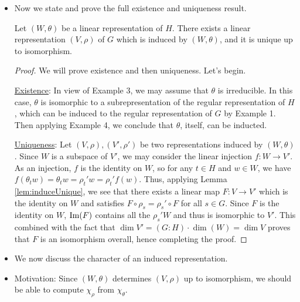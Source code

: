 \documentclass[../notes.tex]{subfiles}
\begin{document}
\begin{itemize}
\begin{lemma}
\begin{proof}
            \begin{equation*}
                \rho_{st}'f(\rho_{st}^{-1}x) = \rho_s'\rho_t'f(\theta_t^{-1}\rho_s^{-1}x)
                = \rho_s'(\theta_t\theta_t^{-1}\rho_s^{-1}x)
                = \rho_s'f(\rho_s^{-1}x)
            \end{equation*}
            We can then check that $F\circ\rho_s=\rho_s'\circ F$ for all $s\in G$. (How?? \textcite{bib:Serre} says it's easy but I'm not seeing it.)
        \end{proof}
    \end{lemma}
    \item Now we state and prove the full existence and uniqueness result.
    \begin{theorem}\label{trm:induceExiUni}
        Let $(W,\theta)$ be a linear representation of $H$. There exists a linear representation $(V,\rho)$ of $G$ which is induced by $(W,\theta)$, and it is unique up to isomorphism.
        \begin{proof}
            We will prove existence and then uniqueness. Let's begin.\par
            \underline{Existence}: In view of Example 3, we may assume that $\theta$ is irreducible. In this case, $\theta$ is isomorphic to a subrepresentation of the regular representation of $H$, which can be induced to the regular representation of $G$ by Example 1. Then applying Example 4, we conclude that $\theta$, itself, can be inducted.\par
            \underline{Uniqueness}: Let $(V,\rho),(V',\rho')$ be two representations induced by $(W,\theta)$. Since $W$ is a subspace of $V'$, we may consider the linear injection $f:W\to V'$. As an injection, $f$ is the identity on $W$, so for any $t\in H$ and $w\in W$, we have $f(\theta_tw)=\theta_tw=\rho_t'w=\rho_t'f(w)$. Thus, applying Lemma \ref{lem:induceUnique}, we see that there exists a linear map $F:V\to V'$ which is the identity on $W$ and satisfies $F\circ\rho_s=\rho_s'\circ F$ for all $s\in G$. Since $F$ is the identity on $W$, $\operatorname{Im}(F)$ contains all the $\rho_s'W$ and thus is isomorphic to $V'$. This combined with the fact that $\dim V'=(G:H)\cdot\dim(W)=\dim V$ proves that $F$ is an isomorphism overall, hence completing the proof.
        \end{proof}
    \end{theorem}
    \item We now discuss the character of an induced representation.
    \item Motivation: Since $(W,\theta)$ determines $(V,\rho)$ up to isomorphism, we should be able to compute $\chi_\rho$ from $\chi_\theta$.

\end{itemize}
\end{document}
